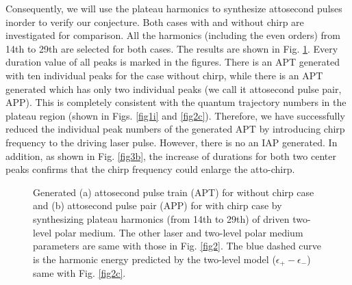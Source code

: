 \documentclass[10pt,letterpaper]{article}
\begin{document}
Consequently, we will use the plateau harmonics to synthesize attosecond pulses inorder to verify our conjecture. Both cases with and without chirp are investigated for comparison. All the harmonics (including the even orders) from 14th to 29th are selected for both cases. The results are shown in Fig. \ref{fig3}. Every duration value of all peaks is marked in the figures. There is an APT generated with ten individual peaks for the case without chirp, while there is an APT generated which has only two individual peaks (we call it attosecond pulse pair, APP). This is completely consistent with the quantum trajectory numbers in the plateau region (shown in Figs. \ref{fig1i} and \ref{fig2c}). Therefore, we have successfully reduced the individual peak numbers of the generated APT by introducing chirp frequency to the driving laser pulse. However, there is no an IAP generated. In addition, as shown in Fig. \ref{fig3b}, the increase of durations for both two center peaks confirms that the chirp frequency could enlarge the atto-chirp.

\begin{figure}[!htbp]
	\centering
	\caption{Generated (a) attosecond pulse train (APT) for without chirp case and (b) attosecond pulse pair (APP) for with chirp case by synthesizing plateau harmonics (from 14th to 29th) of driven two-level polar medium. The other laser and two-level polar medium parameters are same with those in Fig. \ref{fig2}. The blue dashed curve is the harmonic energy predicted by the two-level model ($\epsilon_{+}-\epsilon_{-}$) same with Fig. \ref{fig2c}.}
	\label{fig3}
\end{figure}
	
\end{document}
